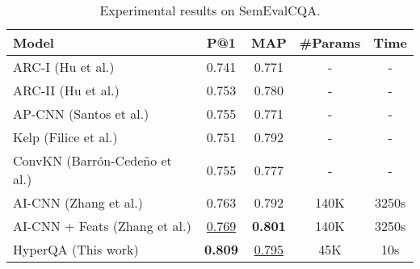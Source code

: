\documentclass[sigconf]{acmart}
\begin{document}
\begin{table}[ht]
\small
  \centering

    \begin{tabular}{lcccc}
    \hline
    Model & P@1   & MAP   & \#Params & Time \\
    \hline
    ARC-I (Hu et al.) & 0.741 & 0.771 &  -     & - \\
    ARC-II (Hu et al.) & 0.753 & 0.780 &  -     & - \\
    AP-CNN (Santos et al.)   & 0.755 & 0.771 &   -    & - \\
    Kelp  (Filice et al.) & 0.751 & 0.792 &   -    & -  \\
    ConvKN (Barr{\'{o}}n{-}Cede{\~{n}}o et al.)& 0.755 & 0.777 &  -     & -  \\
    AI-CNN (Zhang et al.)  & 0.763 & 0.792 &  140K     &  3250s\\
    AI-CNN + Feats (Zhang et al.) & \underline{0.769} & \textbf{0.801} &  140K      & 3250s \\
    \hline
    HyperQA (This work) & \textbf{0.809} & \underline{0.795} & 45K    &  10s \\
    \hline
    \end{tabular}

    \caption{Experimental results on SemEvalCQA.}
  \label{tab:results_se}\end{table}
\end{document}

